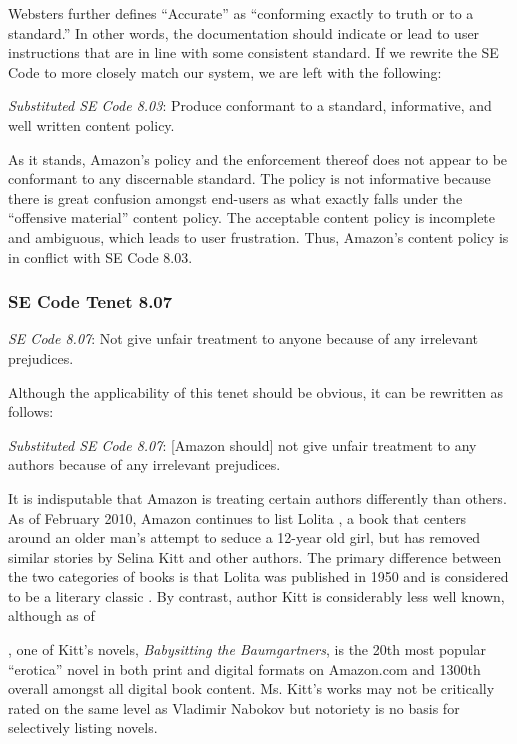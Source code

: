\documentclass[11pt]{article}
\begin{document}
\begin{multicols}{2}
Websters further defines ``Accurate'' as ``conforming exactly to truth or to a standard.'' \cite{WebsterOnlineDict} In other words, the documentation should indicate or lead to user instructions that are in line with some consistent standard.  If we rewrite the SE Code to more closely match our system, we are left with the following:

\emph{Substituted SE Code 8.03}: Produce conformant to a standard, informative, and well written content policy.

As it stands, Amazon's policy and the enforcement thereof does not appear to be conformant to any discernable standard.  The policy is not informative because there is great confusion amongst end-users as what exactly falls under the ``offensive material'' content policy.  \cite{KittSelfPubRevolution, ShermanAmazonExecs}  The acceptable content policy is incomplete and ambiguous, which leads to user frustration.  Thus, Amazon's content policy is in conflict with SE Code 8.03.


\subsubsection{SE Code Tenet 8.07}

\emph{SE Code 8.07}: Not give unfair treatment to anyone because of any irrelevant prejudices.

Although the applicability of this tenet should be obvious, it can be rewritten as follows:

\emph{Substituted SE Code 8.07}: [Amazon should] not give unfair treatment to any authors because of any irrelevant prejudices.

It is indisputable that Amazon is treating certain authors differently than others.  As of February 2010, Amazon continues to list Lolita \cite{AmazonLolitaDTPListing}, a book that centers around an older man's attempt to seduce a 12-year old girl, but has removed similar stories by Selina Kitt and other authors. \cite{KittSelfPubRevolution}  The primary difference between the two categories of books is that Lolita was published in 1950 \cite{WikipediaLolita} and is considered to be a literary classic \cite{MLTop100}.  By contrast, author Kitt is considerably less well known, although as of \date{February 24, 2011}, one of Kitt's novels, \emph{Babysitting the Baumgartners}, is the 20th most popular ``erotica'' novel in both print and digital formats on Amazon.com and 1300th overall amongst all digital book content. \cite{AmazonBabysittingListing} Ms. Kitt's works may not be critically rated on the same level as Vladimir Nabokov but notoriety is no basis for selectively listing novels.


\end{multicols}
\end{document}
